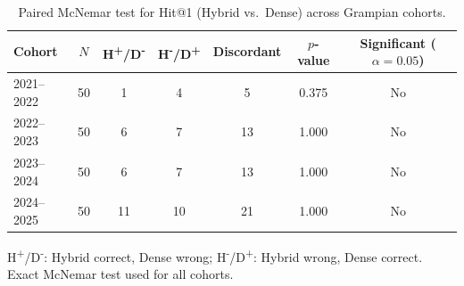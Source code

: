 \begin{table}[htbp]
\centering
\caption{Paired McNemar test for Hit@1 (Hybrid vs.\ Dense) across Grampian cohorts.}
\label{tab:mcnemar_hit1_grampian}
\begin{tabular}{lcccccc}
\toprule
Cohort & $N$ & H\textsuperscript{+}/D\textsuperscript{-} & H\textsuperscript{-}/D\textsuperscript{+} & Discordant & $p$-value & Significant ($\alpha=0.05$) \\
\midrule
2021--2022 & 50 & 1 & 4 & 5  & 0.375 & No \\
2022--2023 & 50 & 6 & 7 & 13 & 1.000 & No \\
2023--2024 & 50 & 6 & 7 & 13 & 1.000 & No \\
2024--2025 & 50 & 11 & 10 & 21 & 1.000 & No \\
\bottomrule
\end{tabular}
\vspace{0.4em}
\begin{minipage}{0.92\linewidth}
\footnotesize H\textsuperscript{+}/D\textsuperscript{-}: Hybrid correct, Dense wrong; H\textsuperscript{-}/D\textsuperscript{+}: Hybrid wrong, Dense correct. Exact McNemar test used for all cohorts.
\end{minipage}
\end{table}
